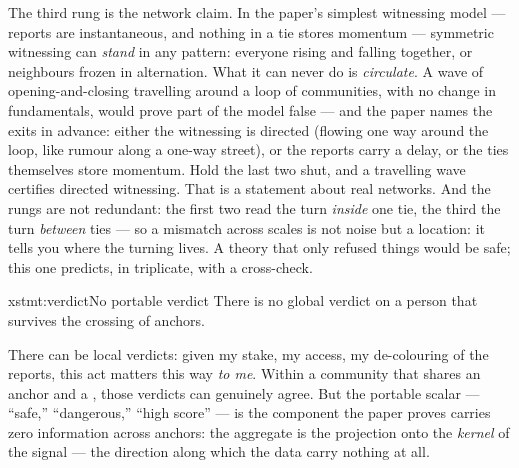 \documentclass[../main_explainer]{subfiles}
\begin{document}
The third rung is the network claim. In the paper's simplest witnessing model ---
reports are instantaneous, and nothing in a tie stores momentum --- symmetric witnessing
can \emph{stand} in any pattern: everyone rising and falling together, or neighbours
frozen in alternation. What it can never do is \emph{circulate}. A wave of
opening-and-closing travelling around a loop of communities, with no change in
fundamentals, would prove part of the model false --- and the paper names the exits in
advance: either the witnessing is directed (flowing one way around the loop, like rumour
along a one-way street), or the reports carry a delay, or the ties themselves store
momentum. Hold the last two shut, and a travelling wave certifies directed witnessing.
That is a  statement about real networks. And the rungs are not redundant: the
first two read the turn \emph{inside} one tie, the third the turn \emph{between} ties
--- so a mismatch across scales is not noise but a location: it tells you where the
turning lives. A theory that only refused things would be safe; this one predicts, in
triplicate, with a cross-check.


\begin{statement}{xstmt:verdict}{No portable verdict}
  There is no global verdict on a person that survives the crossing of anchors.
\end{statement}

There can be local verdicts: given my stake, my access, my de-colouring of the reports,
this act matters this way \emph{to me}. Within a community that shares an anchor and a
, those verdicts can genuinely agree. But the
portable scalar --- ``safe,'' ``dangerous,'' ``high score'' --- is the component the
paper proves carries zero information across anchors: the aggregate is the projection
onto the \emph{kernel} of the signal --- the direction along which the data carry
nothing at all.
\end{document}
